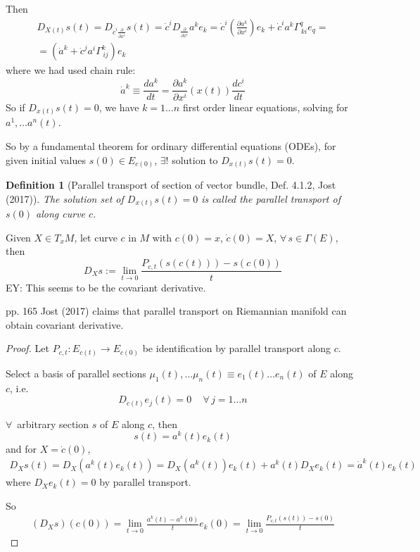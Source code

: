 \documentclass[10pt]{amsart}
\newtheorem{definition}{Definition}
\begin{document}
\begin{multicols*}{2}
Then
\[
\begin{gathered}
	D_{X(t)} s(t) = D_{\dot{c}^i \frac{\partial}{\partial x^i} } s(t) = \dot{c}^i D_{ \frac{\partial }{\partial x^i}} a^k e_k = \dot{c}^i \left( \frac{ \partial a^k}{ \partial x^i} \right) e_k + \dot{c}^i a^k \Gamma^q_{\, ki} e_q = \\
	= \left( \dot{a}^k + \dot{c}^j a^i \Gamma^k_{\, ij} \right) e_k
\end{gathered}\]
where we had used chain rule:
\[
\dot{a}^k \equiv \frac{da^k}{dt} = \frac{\partial a^k}{\partial x^i} (x(t)) \frac{dc^i}{dt}
\]
So if $D_{x(t)} s(t) = 0$, we have $k=1 \dots n$ first order linear equations, solving for $a^1, \dots a^n(t)$.

So by a fundamental theorem for ordinary differential equations (ODEs), for given initial values $s(0) \in E_{c(0)}$, $\exists !$ solution to $D_{x(t)} s(t) = 0$.

\begin{definition}[Parallel transport of section of vector bundle, Def. 4.1.2, Jost (2017)\cite{Jost2017}]
The solution set of $D_{x(t)} s(t) = 0$	 is called the parallel transport of $s(0)$ along curve $c$.
\end{definition}

Given $X \in T_xM$, let curve $c$ in $M$ with $c(0) = x$, $\dot{c}(0) = X$, $\forall \, s \in \Gamma(E)$, then
\[
D_X s := \lim_{t \to 0} \frac{ P_{c,t}(s(c(t))) - s(c(0)) }{ t}
\]
EY: This seems to be the covariant derivative.

pp. 165 Jost (2017) \cite{Jost2017} claims that parallel transport on Riemannian manifold can obtain covariant derivative.

\begin{proof}
	Let $P_{c,t} : E_{c(t)} \to E_{c(0)} $ be identification by parallel transport along $c$.
	
	Select a basis of parallel sections $\mu_1(t), \dots \mu_n(t) \equiv e_1(t) \dots e_n(t)$ of $E$ along $c$, i.e.
	\[
	D_{\dot{c}(t) } e_j(t) = 0 \quad \, \forall \, j = 1 \dots n
	\]
	
	$\forall \,$ arbitrary section $s$ of $E$ along $c$, then 
	\[
	s(t) = a^k(t) e_k(t)
	\]
	and for $X = \dot{c}(0)$,
	\[
	\begin{gathered}
		D_X s(t) = D_X(a^k(t) e_k(t)) = D_X(a^k(t)) e_k(t) + a^k(t) D_X e_k(t) = \dot{a}^k(t) e_k(t)
	\end{gathered}
	\]
	where $D_Xe_k(t)=0$ by parallel transport.
	
	So
	\[
	\begin{gathered}
		(D_Xs) (c(0)) = \lim_{t\to 0} \frac{a^k(t) - a^k(0) }{ t} e_k(0) = \lim_{t\to 0} \frac{ P_{c,t} (s(t)) - s(0) }{t}
	\end{gathered}
	\]
\end{proof}


\end{multicols*}
\end{document}
